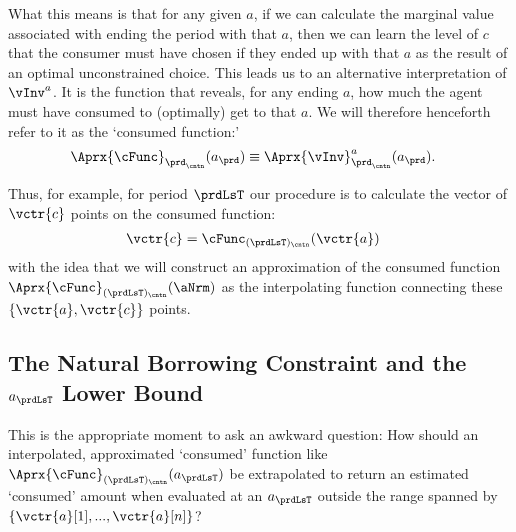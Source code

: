 \documentclass[\econtexRoot/SolvingMicroDSOPs]{subfiles}
\begin{document}
What this means is that for any given $a$, if we can calculate the marginal value associated with ending the period with that $a$, then we can learn the level of $c$ that the consumer must have chosen if they ended up with that $a$ as the result of an optimal unconstrained choice.  This leads us to an alternative interpretation of $\vInv^{a}$. It is the function that reveals, for any ending $a$, how much the agent must have consumed to (optimally) get to that $a$.  We will therefore henceforth refer to it as the `consumed function:'
\begin{equation}\begin{gathered}\begin{aligned}
      \Aprx{\cFunc}_{\prd_\cntn}(a_{\prd}) & \equiv \Aprx{\vInv}^{a}_{\prd_\cntn}(a_{\prd}) \label{eq:consumedfn}.    
    \end{aligned}\end{gathered}\end{equation}

Thus, for example, for period $\prdLsT$ our procedure is to calculate the vector of $\vctr{c}$ points on the consumed function:
\begin{equation}\begin{gathered}\begin{aligned}
      \vctr{c} & = \cFunc_{(\prdLsT)_\cntn}(\vctr{a}) \label{eq:consumedfnvecs}     
    \end{aligned}\end{gathered}\end{equation}
with the idea that we will construct an approximation of the consumed function $\Aprx{\cFunc}_{(\prdLsT)_\cntn}(\aNrm)$ as the interpolating function connecting these $\{\vctr{a},\vctr{c}\}$ points.

\hypertarget{the-natural-borrowing-constraint-and-the-a-lower-bound}{}
\subsection{The Natural Borrowing Constraint and the $a_{\prdLsT}$ Lower Bound} \label{subsec:LiqConstrSelfImposed}

This is the appropriate moment to ask an awkward question: How should an interpolated, approximated `consumed' function like $\Aprx{\cFunc}_{(\prdLsT)_\cntn}(a_{\prdLsT})$ be extrapolated to return an estimated `consumed' amount when evaluated at an $a_{\prdLsT}$ outside the range spanned by $\{\vctr{a}[1],...,\vctr{a}[n]\}$?
\end{document}
